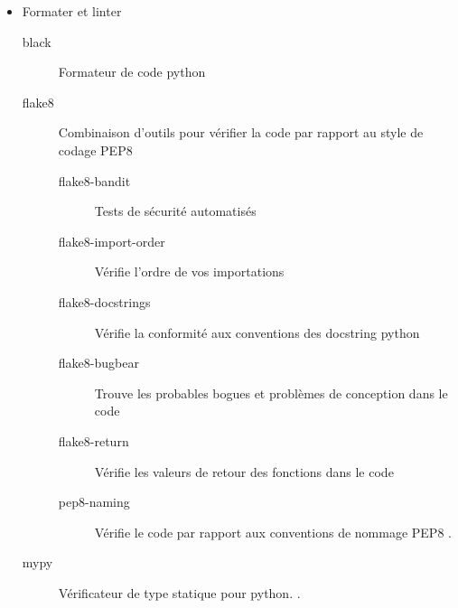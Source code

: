 \begin{itemize}
    \item Formater et linter
          \begin{description}
              \item[black] Formateur de code \gls{python} \cite{black}
              \item[flake8] Combinaison d'outils pour vérifier la code par rapport au style de codage PEP8
                  \cite{flake8, pep8}
                  \begin{description}
                      \item[flake8-bandit] Tests de sécurité automatisés \cite{flake8_bandit}
                      \item[flake8-import-order] Vérifie l'ordre de vos importations \cite{flake8_import_order}
                      \item[flake8-docstrings] Vérifie la conformité aux conventions des \gls{docstring} \gls{python}
                          \cite{flake8_docstrings}
                      \item[flake8-bugbear] Trouve les probables bogues et problèmes de conception dans le code
                          \cite{flake8_bugbear}
                      \item[flake8-return] Vérifie les valeurs de retour des fonctions dans le code \cite{flake8_return}
                      \item[pep8-naming] Vérifie le code par rapport aux conventions de nommage PEP8 \cite{pep8_naming, pep8}.
                  \end{description}
              \item[mypy]
                  Vérificateur de type statique pour \gls{python}. \cite{mypy}.
          \end{description}


\end{itemize}

